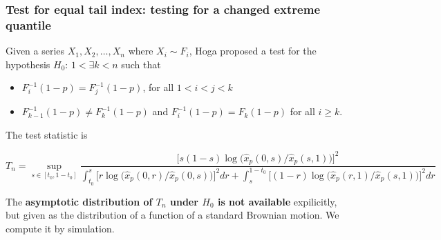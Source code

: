 \documentclass{beamer}
\begin{document}
\begin{frame}
  \frametitle{\small Test for equal tail index: testing for a changed extreme
    quantile}
  Given a series $X_1, X_2, \dots, X_n$ where $X_i \sim F_i$, Hoga
  \cite{hoga:2016} proposed a test for the hypothesis $H_0$:
  $1 < \exists k < n$ such that
  \begin{itemize}
    \item $F_i^{-1}(1 - p) = F_j^{-1}(1 - p)$, for all $1 < i < j < k$
    \item $F_{k-1}^{-1}(1 - p) \neq F_k^{-1}(1 - p)$ and
      $F_i^{-1}(1-p) = F_k(1-p)$ for all $i \geq k$.
  \end{itemize}
  The test statistic is
  \begin{tiny}
  \[
  T_n = \sup_{s \in [t_0, 1 - t_0]}
  \dfrac{  \big[s (1 - s) \log \big(\hat x_p(0, s)/\hat x_p(s, 1)\big)
      \big]^2}{
    \int_{t_0}^s\big[r \log \big( \hat x_p(0, r)/\hat x_p(0, s)
      \big)
      \big]^2 dr
    +
    \int_{s}^{1 - t_0}
    \big[
      (1 - r) \log \big(
      \hat x_p(r, 1)/
      \hat x_p(s, 1)
      \big)
      \big]^2 dr}
  \]
  \end{tiny}
  The {\bf asymptotic distribution of $T_n$ under $H_0$ is not
    available} expilicitly, but given as the distribution of a
  function of a standard Brownian motion. We compute it by simulation.
\end{frame}
\end{document}
